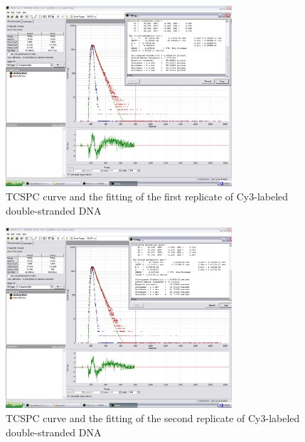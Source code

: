 \documentclass[a4paper,english,12pt,bibliography=totoc]{scrreprt}
\begin{document}
\begin{figure}
    \centering
    \includegraphics[width=0.75\textwidth]{images/dsDNA/dsDNA_Cy3_data1_fit1.png}
    \caption{TCSPC curve and the fitting of the first replicate of Cy3-labeled double-stranded DNA}
    \label{dsDNA_Cy3_data1_fit1}
\end{figure}

\begin{figure}
    \centering
    \includegraphics[width=0.75\textwidth]{images/dsDNA/dsDNA_Cy3_data2_fit1.png}
    \caption{TCSPC curve and the fitting of the second replicate of Cy3-labeled double-stranded DNA}
    \label{dsDNA_Cy3_data2_fit1}
\end{figure}
\end{document}
